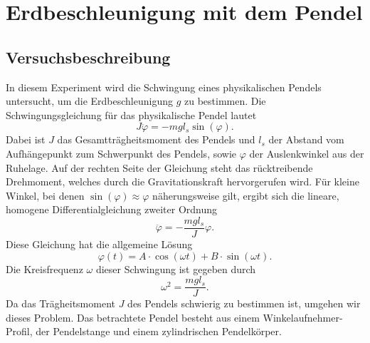 \section{Erdbeschleunigung mit dem Pendel}


\subsection{Versuchsbeschreibung}

In diesem Experiment wird die Schwingung eines physikalischen Pendels untersucht, um die Erdbeschleunigung $g$ zu bestimmen. Die Schwingungsgleichung für das physikalische Pendel lautet
$$J \ddot \varphi = - mgl_s \sin(\varphi)\text{.}$$
Dabei ist $J$ das Gesamtträgheitsmoment des Pendels und $l_s$ der Abstand vom Aufhängepunkt zum Schwerpunkt des Pendels, sowie $\varphi$ der Auslenkwinkel aus der Ruhelage. Auf der rechten Seite der Gleichung steht das rücktreibende Drehmoment, welches durch die Gravitationskraft hervorgerufen wird. Für kleine Winkel, bei denen $\sin(\varphi) \approx \varphi$ näherungsweise gilt, ergibt sich die lineare, homogene Differentialgleichung zweiter Ordnung
$$\ddot \varphi = -\frac{mgl_s}J \varphi\text{.}$$
Diese Gleichung hat die allgemeine Lösung
$$\varphi(t) = A\cdot \cos(\omega t)+ B\cdot \sin(\omega t)\text{.}$$
Die Kreisfrequenz $\omega$ dieser Schwingung ist gegeben durch
$$\omega^2 = \frac{mgl_s}J\text{.}$$
Da das Trägheitsmoment $J$ des Pendels schwierig zu bestimmen ist, umgehen wir dieses Problem. Das betrachtete Pendel besteht aus einem Winkelaufnehmer-Profil, der Pendelstange und einem zylindrischen Pendelkörper.

